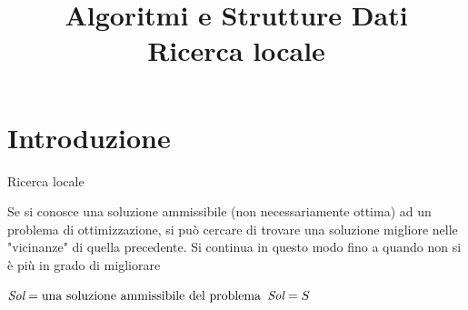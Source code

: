 
\title[ASD - Ricerca locale]{\textbf{Algoritmi e Strutture Dati}\\[24pt]Ricerca locale}

\usepackage{xcolor}
\usepackage{colortbl}
\usepackage{epigraph}
\usepackage{tikz}
\usetikzlibrary{trees}
\usetikzlibrary{matrix}
\usetikzlibrary{graphs}
\usetikzlibrary{shapes}
\usetikzlibrary{positioning}
\usepackage{xmpmulti}
\usepackage{listings}



\newcommand*\circled[1]{\tikz[baseline=(char.base)]{
            \node[circle,ball color=blue, shade, 
 color=white,inner sep=1.2pt] (char) {\tiny #1};}}

\newcommand{\R}[1]{\textcolor{red}{#1}}
\newcommand{\B}[1]{\textcolor{blue}{#1}}
\newcommand{\G}[1]{\textcolor{violet}{#1}}

\graphicspath{{figs/15/}}




\FrameTitle{}

\FrameContent



\section{Introduzione}

\begin{frame}{Ricerca locale}

Se si conosce una soluzione ammissibile (non necessariamente ottima) ad un
problema di ottimizzazione, si può cercare di trovare una soluzione migliore
nelle "vicinanze" di quella precedente. Si continua in questo modo fino a
quando non si è più in grado di migliorare


\begin{Procedure}
\caption[A]{\ricercalocale()}
$\textit{Sol} = \textrm{una soluzione ammissibile del problema}$\;
{
  $\textit{Sol} = S$\;
}
\Return \Sol\;
\end{Procedure}


\end{frame}

